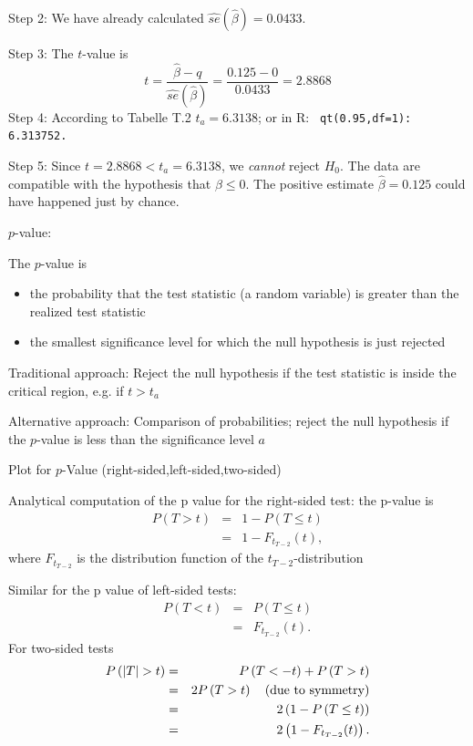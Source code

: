 \documentclass{article}
\begin{document}
Step 2: We have already calculated $\widehat{se}(\hat{\beta})=0.0433.$

Step 3: The $t$-value is%
\[
t=\frac{\hat{\beta}-q}{\widehat{se}(\hat{\beta})}=\frac{0.125-0}{0.0433}%
=2.8868 
\]%
Step 4: According to Tabelle T.2 $t_{a}=6.3138$; or in R: \texttt{%
	qt(0.95,df=1): 6.313752.}

Step 5: Since $t=2.8868<t_{a}=6.3138$, we \emph{cannot }reject $H_{0}.$ The
data are compatible with the hypothesis that $\beta \leq 0.$ The positive
estimate $\hat{\beta}=0.125$ could have happened just by chance.

$p$-value:

The $p$-value is
\begin{itemize}
\item the probability that the test statistic (a random variable) is greater than the realized test statistic
\item the smallest significance level for which the null hypothesis is just rejected
\end{itemize}

Traditional approach: Reject the null hypothesis if the test statistic is inside the critical region, e.g. if $t>t_{a}$

Alternative approach: Comparison of probabilities; reject the null hypothesis if the $p$-value is less than the significance level $a$

Plot for $p$-Value (right-sided,left-sided,two-sided)

Analytical computation of the p value for the right-sided test: the p-value is
\begin{eqnarray*}
P(T>t) &=&1-P(T\leq t) \\
&=&1-F_{t_{T-2}}(t),
\end{eqnarray*}
where $F_{t_{T-2}}$ is the distribution function of the $t_{T-2}$-distribution

Similar for the p value of left-sided tests:
\begin{eqnarray*}
P(T<t) &=&P(T\leq t) \\
&=&F_{t_{T-2}}(t).
\end{eqnarray*}
For two-sided tests
\begin{eqnarray*}
P\left( |T|>t\right) &=&P\left( T<-t\right) +P\left( T>t\right) \\
&=&2P\left( T>t\right) \text{\quad (due to symmetry)} \\
&=&2\left( 1-P\left( T\leq t\right) \right) \\
&=&2\left( 1-F_{t_{T-2}}(t)\right) .
\end{eqnarray*}
\end{document}
